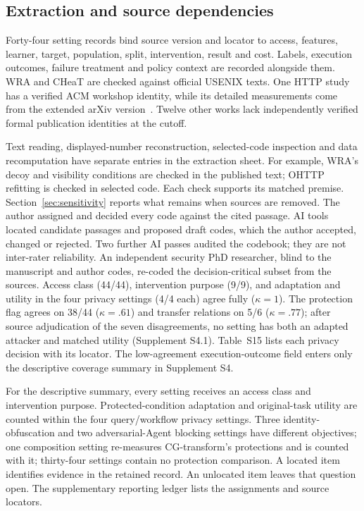 \subsection{Extraction and source dependencies}
Forty-four setting records bind source version and locator to access, features, learner, target, population, split, intervention, result and cost. Labels, execution outcomes, failure treatment and policy context are recorded alongside them. WRA and CHeaT are checked against official USENIX texts. One HTTP study has a verified ACM workshop identity, while its detailed measurements come from the extended arXiv version~\cite{borysenko2026http,borysenko2026short}. Twelve other works lack independently verified formal publication identities at the cutoff.

Text reading, displayed-number reconstruction, selected-code inspection and data recomputation have separate entries in the extraction sheet. For example, WRA's decoy and visibility conditions are checked in the published text; OHTTP refitting is checked in selected code. Each check supports its matched premise. Section~\ref{sec:sensitivity} reports what remains when sources are removed. The author assigned and decided every code against the cited passage. AI tools located candidate passages and proposed draft codes, which the author accepted, changed or rejected. Two further AI passes audited the codebook; they are not inter-rater reliability. An independent security PhD researcher, blind to the manuscript and author codes, re-coded the decision-critical subset from the sources. Access class (44/44), intervention purpose (9/9), and adaptation and utility in the four privacy settings (4/4 each) agree fully ($\kappa=1$). The protection flag agrees on 38/44 ($\kappa=.61$) and transfer relations on 5/6 ($\kappa=.77$); after source adjudication of the seven disagreements, no setting has both an adapted attacker and matched utility (Supplement S4.1). Table~S15 lists each privacy decision with its locator. The low-agreement execution-outcome field enters only the descriptive coverage summary in Supplement S4.

For the descriptive summary, every setting receives an access class and intervention purpose. Protected-condition adaptation and original-task utility are counted within the four query/workflow privacy settings. Three identity-obfuscation and two adversarial-Agent blocking settings have different objectives; one composition setting re-measures CG-transform's protections and is counted with it; thirty-four settings contain no protection comparison. A located item identifies evidence in the retained record. An unlocated item leaves that question open. The supplementary reporting ledger lists the assignments and source locators.

